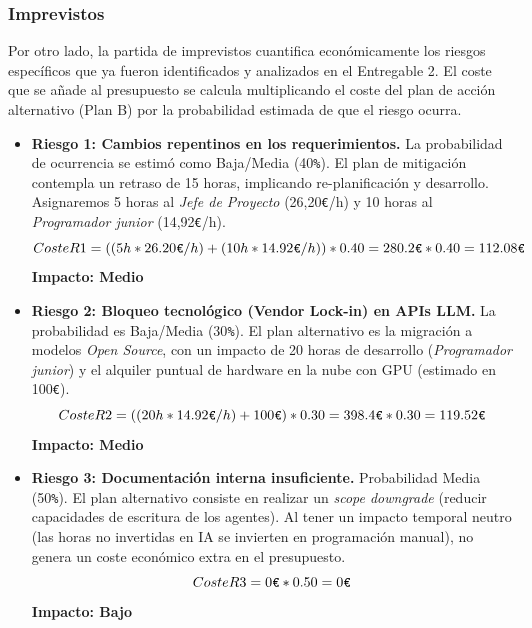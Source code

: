 \documentclass[11pt, letterpaper]{article}
\begin{document}
\subsubsection{Imprevistos}
Por otro lado, la partida de imprevistos cuantifica económicamente los riesgos específicos que ya fueron identificados y analizados en el Entregable 2. El coste que se añade al presupuesto se calcula multiplicando el coste del plan de acción alternativo (Plan B) por la probabilidad estimada de que el riesgo ocurra.

\begin{itemize}
    \item \textbf{Riesgo 1: Cambios repentinos en los requerimientos.} La probabilidad de ocurrencia se estimó como Baja/Media (40\verb|%|). El plan de mitigación contempla un retraso de 15 horas, implicando re-planificación y desarrollo. Asignaremos 5 horas al \textit{Jefe de Proyecto} (26,20\verb|€|/h) y 10 horas al \textit{Programador junior} (14,92\verb|€|/h).
    \begin{equation*}
        Coste R1 = ((5h * 26{.}20\verb|€|/h) + (10h * 14{.}92\verb|€|/h)) * 0{.}40 = 280{.}2\verb|€| * 0{.}40 = 112{.}08\verb|€|
    \end{equation*}
    \textbf{Impacto: Medio}

    \item \textbf{Riesgo 2: Bloqueo tecnológico (Vendor Lock-in) en APIs LLM.} La probabilidad es Baja/Media (30\verb|%|). El plan alternativo es la migración a modelos \textit{Open Source}, con un impacto de 20 horas de desarrollo (\textit{Programador junior}) y el alquiler puntual de hardware en la nube con GPU (estimado en 100\verb|€|).
    \begin{equation*}
        Coste R2 = ((20h * 14{.}92\verb|€|/h) + 100\verb|€|) * 0{.}30 = 398{.}4\verb|€| * 0{.}30 = 119{.}52\verb|€|
    \end{equation*}
    \textbf{Impacto: Medio}

    \item \textbf{Riesgo 3: Documentación interna insuficiente.} Probabilidad Media (50\verb|%|). El plan alternativo consiste en realizar un \textit{scope downgrade} (reducir capacidades de escritura de los agentes). Al tener un impacto temporal neutro (las horas no invertidas en IA se invierten en programación manual), no genera un coste económico extra en el presupuesto.
    \begin{equation*}
        Coste R3 = 0\verb|€| * 0{.}50 = 0\verb|€|
    \end{equation*}
    \textbf{Impacto: Bajo}


\end{itemize}
\end{document}
